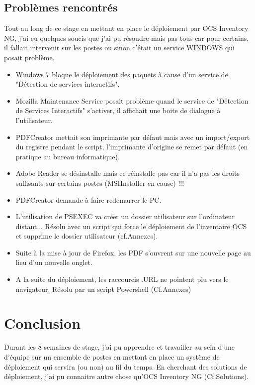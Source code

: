 \documentclass[11pt,a4paper,oneside]{article}
\begin{document}
\subsection{Problèmes rencontrés}
Tout au long de ce stage en mettant en place le déploiement par OCS Inventory NG, j'ai eu quelques soucis que j'ai pu résoudre mais pas tous car pour certains, il fallait intervenir sur les postes ou sinon c'était un service WINDOWS qui posait problème.
\\
\begin{itemize}
\item Windows 7 bloque le déploiement des paquets à cause d'un service de "Détection de services interactifs".
\item Mozilla Maintenance Service posait problème quand le service de "Détection de Services Interactifs" s'activer, il affichait une boite de dialogue à l'utilisateur.
\item PDFCreator mettait son imprimante par défaut mais avec un import/export du registre pendant le script, l'imprimante d'origine se remet par défaut (en pratique au bureau informatique).
\item  Adobe Reader se désinstalle mais ce réinstalle pas car il n'a pas les droits suffisants sur certains postes (MSIInstaller en cause) !!!
\item PDFCreator demande à faire redémarrer le PC.
\item L'utilisation de PSEXEC va créer un dossier utilisateur sur l'ordinateur distant... Résolu avec un script qui force le déploiement de l'inventaire OCS et supprime le dossier utilisateur (cf.Annexes).
\item Suite à la mise à jour de Firefox, les PDF s'ouvrent sur une nouvelle page au lieu d'un nouvelle onglet.
\item A la suite du déploiement, les raccourcis .URL ne pointent plu vers le navigateur. Résolu par un script Powershell (Cf.Annexes)
\end{itemize}

\section{Conclusion}
Durant les 8 semaines de stage, j'ai pu apprendre et travailler au sein d'une d'équipe sur un ensemble de postes en mettant en place un système de déploiement qui servira (ou non) au fil du temps. En cherchant des solutions de déploiement, j'ai pu connaitre autre chose qu'OCS Inventory NG (Cf.Solutions).
\end{document}
